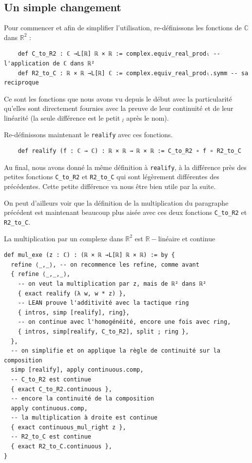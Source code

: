 \documentclass[a4paper, 11pt, twoside]{report}
\newcommand\R{\mathbb{R}}
\newcommand\C{\mathbb{C}}
\begin{document}
	\subsection{Un simple changement}
	
	Pour commencer et afin de simplifier l'utilisation, re-définissons les fonctions de $\C$ dans $\R^2$ :
	
\begin{lstlisting}
	def C_to_R2 : ℂ →L[ℝ] ℝ × ℝ := complex.equiv_real_prodₗ -- l'application de ℂ dans ℝ²
	def R2_to_C : ℝ × ℝ →L[ℝ] ℂ := complex.equiv_real_prodₗ.symm -- sa reciproque 
\end{lstlisting}

Ce sont les fonctions que nous avons vu depuis le début avec la particularité qu'elles sont directement fournies avec la preuve de leur continuité et de leur linéarité (la seule différence est le petit $_l$ après le nom). 

\medskip

Re-définissons maintenant le \verb|realify| avec ces fonctions. 

\begin{lstlisting}
	def realify (f : ℂ → ℂ) : ℝ × ℝ → ℝ × ℝ := C_to_R2 ∘ f ∘ R2_to_C  
\end{lstlisting}

Au final, nous avons donné la même définition à \verb|realify|, à la différence près des petites fonctions \verb|C_to_R2| et \verb|R2_to_C| qui sont légèrement différentes des précédentes. Cette petite différence va nous être bien utile par la suite.

On peut d'ailleurs voir que la définition de la multiplication du paragraphe précédent est maintenant beaucoup plus aisée avec ces deux fonctions \verb|C_to_R2| et \verb|R2_to_C|.

\begin{code}{La multiplication par un complexe dans $\R^2$ est $\R-$linéaire et continue}
\begin{lstlisting}
def mul_exe (z : ℂ) : (ℝ × ℝ →L[ℝ] ℝ × ℝ) := by {
  refine ⟨_,_⟩, -- on recommence les refine, comme avant
  { refine ⟨_,_,_⟩,
    -- on veut la multiplication par z, mais de ℝ² dans ℝ²
    { exact realify (λ w, w * z) }, 
    -- LEAN prouve l'additivité avec la tactique ring
    { intros, simp [realify], ring}, 
    -- on continue avec l'homogénéité, encore une fois avec ring,
    { intros, simp[realify, C_to_R2], split ; ring }, 
  },
  -- on simplifie et on applique la règle de continuité sur la composition
  simp [realify], apply continuous.comp,
  -- C_to_R2 est continue
  { exact C_to_R2.continuous },
  -- encore la continuité de la composition
  apply continuous.comp,
  -- la multiplication à droite est continue
  { exact continuous_mul_right z },
  -- R2_to_C est continue
  { exact R2_to_C.continuous },
}
\end{lstlisting}
\end{code}
\end{document}
